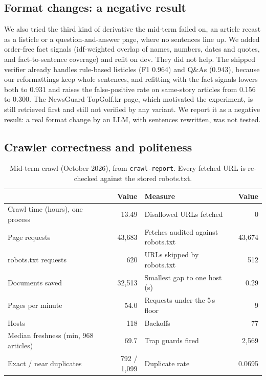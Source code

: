 \documentclass[11pt,a4paper]{article}
\newcommand{\hd}[1]{{\headfont\bfseries\footnotesize #1}}
\newcommand{\hrow}{\rowcolor{paper}}
\newcommand{\code}[1]{\texttt{#1}}
\begin{document}
\subsection{Format changes: a negative result}

We also tried the third kind of derivative the mid-term failed on, an article recast as a listicle or a question-and-answer page, where no sentences line up. We added order-free fact signals (idf-weighted overlap of names, numbers, dates and quotes, and fact-to-sentence coverage) and refit on dev. They did not help. The shipped verifier already handles rule-based listicles (F1 0.964) and Q\&As (0.943), because our reformattings keep whole sentences, and refitting with the fact signals lowers both to 0.931 and raises the false-positive rate on same-story articles from 0.156 to 0.300. The NewsGuard TopGolf.kr page, which motivated the experiment, is still retrieved first and still not verified by any variant. We report it as a negative result: a real format change by an LLM, with sentences rewritten, was not tested.


\subsection{Crawler correctness and politeness}
\label{sec:crawl}

\begin{table}[t]
  \centering\small
  \caption{Mid-term crawl (October 2026), from \code{crawl-report}. Every fetched URL is re-checked against the stored robots.txt.}
  \label{tab:crawl}
  \begin{tabularx}{\textwidth}{@{}Xr@{\hspace{2.2em}}Xr@{}}
    \toprule
    \hrow \hd{Measure} & \hd{Value} & \hd{Measure} & \hd{Value} \\
    \midrule
    Crawl time (hours), one process & 13.49 & Disallowed URLs fetched & 0 \\
    Page requests & 43,683 & Fetches audited against robots.txt & 43,674 \\
    robots.txt requests & 620 & URLs skipped by robots.txt & 512 \\
    Documents saved & 32,513 & Smallest gap to one host (s) & 0.29 \\
    Pages per minute & 54.0 & Requests under the 5\,s floor & 9 \\
    Hosts & 118 & Backoffs & 77 \\
    Median freshness (min, 968 articles) & 69.7 & Trap guards fired & 2,569 \\
    Exact / near duplicates & 792 / 1,099 & Duplicate rate & 0.0695 \\
    \bottomrule
  \end{tabularx}
\end{table}
\end{document}
